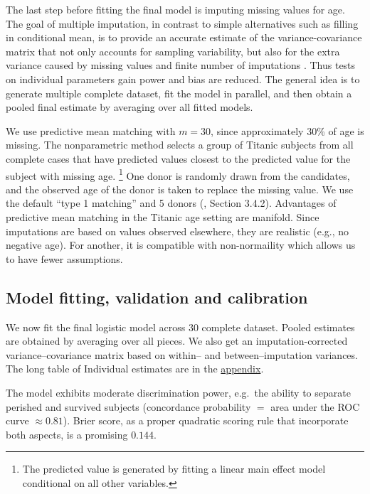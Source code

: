 \documentclass[]{interact}
\theoremstyle{plain}%
\theoremstyle{definition}
\theoremstyle{remark}
\begin{document}
The last step before fitting the final model is imputing missing values for age. The goal of multiple imputation, in contrast to simple alternatives such as filling in conditional mean, is to provide an accurate estimate of the variance-covariance matrix that not only accounts for sampling variability, but also for the extra variance caused by missing values and finite number of imputations \citep{van2018flexible}. Thus tests on individual parameters gain power and bias are reduced. The general idea is to generate multiple complete dataset, fit the model in parallel, and then obtain a pooled final estimate by averaging over all fitted models.

We use predictive mean matching with \(m = 30\), since approximately 30\% of age is missing. The nonparametric method selects a group of Titanic subjects from all complete cases that have predicted values closest to the predicted value for the subject with missing age. \footnote{The predicted value is generated by fitting a linear main effect model conditional on all other variables.} One donor is randomly drawn from the candidates, and the observed age of the donor is taken to replace the missing value. We use the default ``type 1 matching'' and 5 donors (\citet{van2018flexible}, Section 3.4.2). Advantages of predictive mean matching in the Titanic age setting are manifold. Since imputations are based on values observed elsewhere, they are realistic (e.g., no negative age). For another, it is compatible with non-normaility which allows us to have fewer assumptions.

\hypertarget{fit}{%
\subsection{Model fitting, validation and calibration}\label{fit}}

We now fit the final logistic model across 30 complete dataset. Pooled estimates are obtained by averaging over all pieces. We also get an imputation-corrected variance--covariance matrix based on within-- and between--imputation variances. The long table of Individual estimates are in the \protect\hyperlink{formula}{appendix}.

The model exhibits moderate discrimination power, e.g.~the ability to separate perished and survived subjects (concordance probability \(=\) area under the ROC curve \(\approx 0.81\)). Brier score, as a proper quadratic scoring rule that incorporate both aspects, is a promising \(0.144\).
\end{document}
